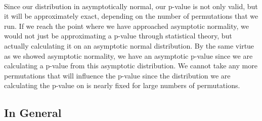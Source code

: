 \newline\\
Since our distribution in asymptotically normal, our p-value is not only valid, but it will be approximately exact, depending on the number of permutations that we run. If we reach the point where we have approached asymptotic normality, we would not just be approximating a p-value through statistical theory, but actually calculating it on an asymptotic normal distribution. By the same virtue as we showed asymptotic normality, we have an asymptotic p-value since we are calculating a p-value from this asymptotic distribution. We cannot take any more permutations that will influence the p-value since the distribution we are calculating the p-value on is nearly fixed for large numbers of permutations. 

\subsection{In General}

